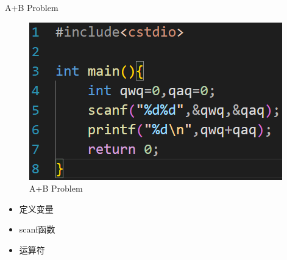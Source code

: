 \documentclass{beamer}
\begin{document}
\begin{frame}{A+B Problem}
    \begin{minipage}{0.45\linewidth}
        \begin{figure}
        \centering
        \includegraphics[width=\linewidth]{pic/A+B Problem.png}
        \caption{A+B Problem}
        \label{fig:A+BProblem}
    \end{figure}
    \end{minipage}
    \hspace{1cm}
    \begin{minipage}{0.37\linewidth}
        \begin{itemize}
            \item 定义变量
            \item scanf函数
            \item 运算符
        \end{itemize}
    \end{minipage}
\end{frame}
\end{document}

